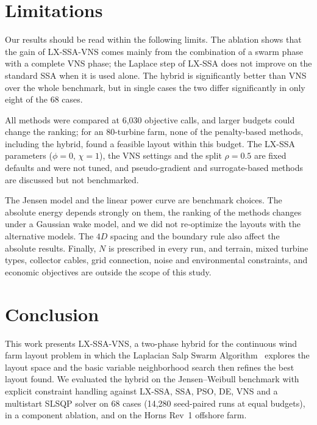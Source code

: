 \documentclass[journal,twoside]{IEEEtran}
\begin{document}
\section{Limitations}
\label{sec:limits}
Our results should be read within the following limits. The ablation shows that the gain of LX-SSA-VNS comes mainly from the combination of a swarm phase with a complete VNS phase; the Laplace step of LX-SSA does not improve on the standard SSA when it is used alone. The hybrid is significantly better than VNS over the whole benchmark, but in single cases the two differ significantly in only eight of the 68 cases.

All methods were compared at 6,030 objective calls, and larger budgets could change the ranking; for an 80-turbine farm, none of the penalty-based methods, including the hybrid, found a feasible layout within this budget. The LX-SSA parameters ($\phi=0$, $\chi=1$), the VNS settings and the split $\rho=0.5$ are fixed defaults and were not tuned, and pseudo-gradient and surrogate-based methods are discussed but not benchmarked.

The Jensen model and the linear power curve are benchmark choices. The absolute energy depends strongly on them, the ranking of the methods changes under a Gaussian wake model, and we did not re-optimize the layouts with the alternative models. The $4D$ spacing and the boundary rule also affect the absolute results. Finally, $N$ is prescribed in every run, and terrain, mixed turbine types, collector cables, grid connection, noise and environmental constraints, and economic objectives are outside the scope of this study.

\section{Conclusion}
\label{sec:conclusion}
This work presents LX-SSA-VNS, a two-phase hybrid for the continuous wind farm layout problem in which the Laplacian Salp Swarm Algorithm~\cite{Solanki2023} explores the layout space and the basic variable neighborhood search then refines the best layout found. We evaluated the hybrid on the Jensen--Weibull benchmark with explicit constraint handling against LX-SSA, SSA, PSO, DE, VNS and a multistart SLSQP solver on 68 cases (14,280 seed-paired runs at equal budgets), in a component ablation, and on the Horns Rev~1 offshore farm.
\end{document}
